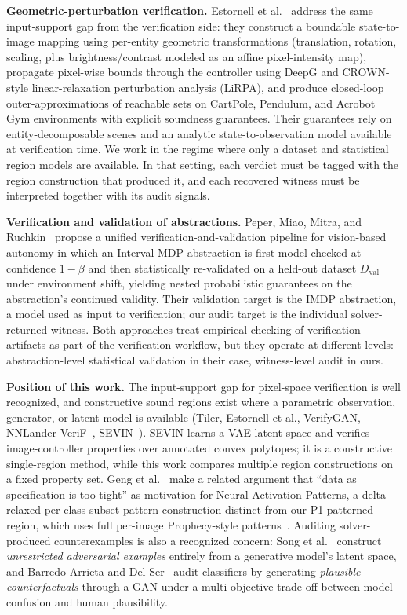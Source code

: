 \documentclass[twocolumn,smallextended,runningheads]{svjour3}
\begin{document}
\textbf{Geometric-perturbation verification.} Estornell et al.~\cite{estornell2025visual} address the same input-support gap from the verification side: they construct a boundable state-to-image mapping using per-entity geometric transformations (translation, rotation, scaling, plus brightness/contrast modeled as an affine pixel-intensity map), propagate pixel-wise bounds through the controller using DeepG and CROWN-style linear-relaxation perturbation analysis (LiRPA), and produce closed-loop outer-approximations of reachable sets on CartPole, Pendulum, and Acrobot Gym environments with explicit soundness guarantees. Their guarantees rely on entity-decomposable scenes and an analytic state-to-observation model available at verification time. We work in the regime where only a dataset and statistical region models are available. In that setting, each verdict must be tagged with the region construction that produced it, and each recovered witness must be interpreted together with its audit signals.

\textbf{Verification and validation of abstractions.} Peper, Miao, Mitra, and Ruchkin~\cite{peper2025unifiedVV} propose a unified verification-and-validation pipeline for vision-based autonomy in which an Interval-MDP abstraction is first model-checked at confidence $1{-}\beta$ and then statistically re-validated on a held-out dataset $D_{\mathrm{val}}$ under environment shift, yielding nested probabilistic guarantees on the abstraction's continued validity. Their validation target is the IMDP abstraction, a model used as input to verification; our audit target is the individual solver-returned witness. Both approaches treat empirical checking of verification artifacts as part of the verification workflow, but they operate at different levels: abstraction-level statistical validation in their case, witness-level audit in ours.

\textbf{Position of this work.} The input-support gap for pixel-space verification is well recognized, and constructive sound regions exist where a parametric observation, generator, or latent model is available (Tiler, Estornell et al., VerifyGAN, NNLander-VeriF~\cite{santacruz2022nnlander}, SEVIN~\cite{parameshwaran2025sevin}). SEVIN learns a VAE latent space and verifies image-controller properties over annotated convex polytopes; it is a constructive single-region method, while this work compares multiple region constructions on a fixed property set. Geng et al.~\cite{geng2023nap} make a related argument that ``data as specification is too tight'' as motivation for Neural Activation Patterns, a delta-relaxed per-class subset-pattern construction distinct from our P1-patterned region, which uses full per-image Prophecy-style patterns~\cite{kadron2021,prophecy2019}. Auditing solver-produced counterexamples is also a recognized concern: Song et al.~\cite{song2018unrestricted} construct \emph{unrestricted adversarial examples} entirely from a generative model's latent space, and Barredo-Arrieta and Del Ser~\cite{barredoarrieta2020plausible} audit classifiers by generating \emph{plausible counterfactuals} through a GAN under a multi-objective trade-off between model confusion and human plausibility.
\end{document}

